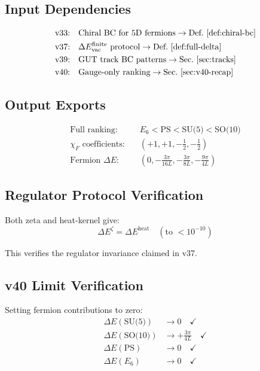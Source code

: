 \documentclass[11pt,a4paper]{article}
\begin{document}
\subsection{Input Dependencies}

\begin{align}
\label{eq:dep-v33}
\text{v33:} \quad &\text{Chiral BC for 5D fermions} \to \text{Def.~\ref{def:chiral-bc}} \\
\label{eq:dep-v37}
\text{v37:} \quad &\Delta E_{\text{vac}}^{\text{finite}} \text{ protocol} \to \text{Def.~\ref{def:full-delta}} \\
\label{eq:dep-v39}
\text{v39:} \quad &\text{GUT track BC patterns} \to \text{Sec.~\ref{sec:tracks}} \\
\label{eq:dep-v40}
\text{v40:} \quad &\text{Gauge-only ranking} \to \text{Sec.~\ref{sec:v40-recap}}
\end{align}

\subsection{Output Exports}

\begin{align}
\label{eq:exp-ranking}
\text{Full ranking:} \quad &E_6 < \text{PS} < \text{SU(5)} < \text{SO(10)} \\
\label{eq:exp-chi-F}
\chi_F \text{ coefficients:} \quad &(+1, +1, -\tfrac{1}{2}, -\tfrac{1}{2}) \\
\label{eq:exp-ferm-contrib}
\text{Fermion } \Delta E: \quad &(0, -\tfrac{3\pi}{16L}, -\tfrac{3\pi}{8L}, -\tfrac{9\pi}{4L})
\end{align}

\subsection{Regulator Protocol Verification}

Both zeta and heat-kernel give:
\begin{equation}
\label{eq:reg-check-final}
\Delta E^{\zeta} = \Delta E^{\text{heat}} \quad (\text{to } < 10^{-10})
\end{equation}

This verifies the regulator invariance claimed in v37.

\subsection{v40 Limit Verification}

Setting fermion contributions to zero:
\begin{align}
\label{eq:v40-lim-su5}
\Delta E(\text{SU(5)}) &\to 0 \quad \checkmark \\
\label{eq:v40-lim-so10}
\Delta E(\text{SO(10)}) &\to +\frac{3\pi}{4L} \quad \checkmark \\
\label{eq:v40-lim-ps}
\Delta E(\text{PS}) &\to 0 \quad \checkmark \\
\label{eq:v40-lim-e6}
\Delta E(E_6) &\to 0 \quad \checkmark
\end{align}
\end{document}
